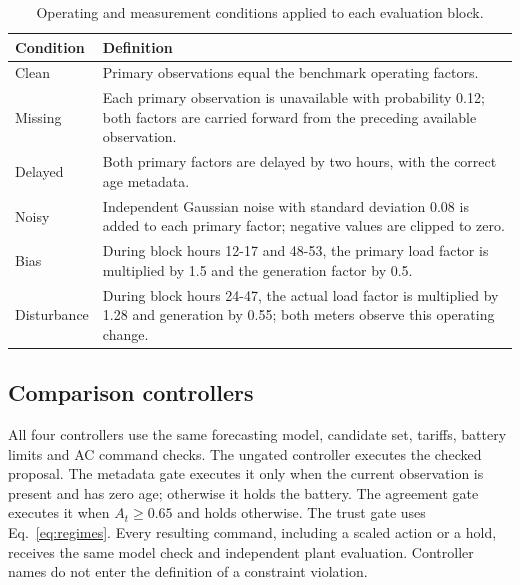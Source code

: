 \documentclass[11pt,a4paper]{article}
\begin{document}
\begin{table}[t]
\centering\small
\caption{Operating and measurement conditions applied to each evaluation block.}\label{tab:scenarios}
\begin{tabular}{p{.16\linewidth}p{.75\linewidth}}
\toprule
Condition & Definition\\\midrule
Clean & Primary observations equal the benchmark operating factors.\\
Missing & Each primary observation is unavailable with probability 0.12; both factors are carried forward from the preceding available observation.\\
Delayed & Both primary factors are delayed by two hours, with the correct age metadata.\\
Noisy & Independent Gaussian noise with standard deviation 0.08 is added to each primary factor; negative values are clipped to zero.\\
Bias & During block hours 12-17 and 48-53, the primary load factor is multiplied by 1.5 and the generation factor by 0.5.\\
Disturbance & During block hours 24-47, the actual load factor is multiplied by 1.28 and generation by 0.55; both meters observe this operating change.\\
\bottomrule
\end{tabular}
\end{table}

\subsection{Comparison controllers}
All four controllers use the same forecasting model, candidate set, tariffs, battery limits and AC command checks. The ungated controller executes the checked proposal. The metadata gate executes it only when the current observation is present and has zero age; otherwise it holds the battery. The agreement gate executes it when $A_t\geq0.65$ and holds otherwise. The trust gate uses Eq.~\eqref{eq:regimes}. Every resulting command, including a scaled action or a hold, receives the same model check and independent plant evaluation. Controller names do not enter the definition of a constraint violation.
\end{document}

